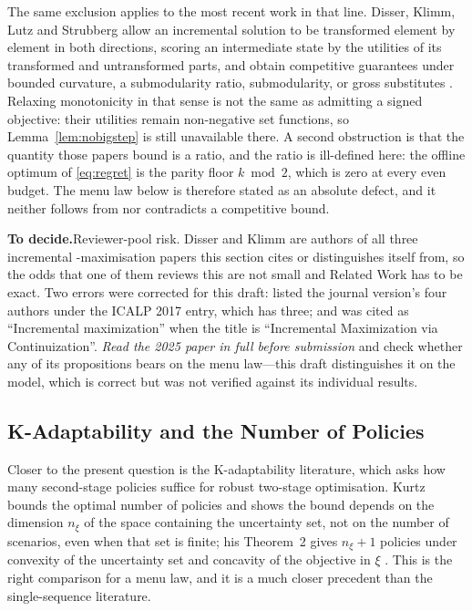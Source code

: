 \documentclass[conference]{IEEEtran}
\theoremstyle{definition}
\newif\ifshownotes\shownotestrue
\newcommand{\TODOPAR}[1]{\ifshownotes\par\vspace{2pt}\noindent%
  {\color{todocol}\textsf{\footnotesize\textbf{To decide.}\;#1}}\par\vspace{2pt}\fi}
\begin{document}
The same exclusion applies to the most recent work in that line. Disser, Klimm, Lutz and
Strubberg allow an incremental solution to be transformed element by element in both
directions, scoring an intermediate state by the utilities of its transformed and
untransformed parts, and obtain competitive guarantees under bounded curvature, a
submodularity ratio, submodularity, or gross substitutes \cite{disser2025}. Relaxing
monotonicity in that sense is not the same as admitting a signed objective: their utilities
remain non-negative set functions, so Lemma~\ref{lem:nobigstep} is still unavailable there.
A second obstruction is that the quantity those papers bound is a ratio, and the ratio is
ill-defined here: the offline optimum of \eqref{eq:regret} is the parity floor
$k\bmod 2$, which is zero at every even budget. The menu law below is therefore stated as an
absolute defect, and it neither follows from nor contradicts a competitive bound.
\TODOPAR{Reviewer-pool risk. Disser and Klimm are authors of all three incremental
-maximisation papers this section cites or distinguishes itself from, so the odds that one of
them reviews this are not small and Related Work has to be exact. Two errors were corrected
for this draft: \cite{bernstein2017} listed the journal version's four authors under the
ICALP 2017 entry, which has three; and \cite{disser2023} was cited as ``Incremental
maximization'' when the title is ``Incremental Maximization via Continuization''. \emph{Read
the 2025 paper in full before submission} and check whether any of its propositions bears on
the menu law---this draft distinguishes it on the model, which is correct but was not verified
against its individual results.}

\subsection{K-Adaptability and the Number of Policies}

Closer to the present question is the K-adaptability literature, which asks how many
second-stage policies suffice for robust two-stage optimisation. Kurtz bounds the optimal
number of policies and shows the bound depends on the dimension $n_{\xi}$ of the space
containing the uncertainty set, not on the number of scenarios, even when that set is finite;
his Theorem~2 gives $n_{\xi}+1$ policies under convexity of the uncertainty set and concavity
of the objective in $\xi$ \cite{kurtz2026}. This is the right comparison for a menu law, and
it is a much closer precedent than the single-sequence literature.
\end{document}
